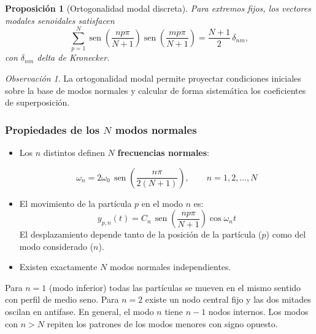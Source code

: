 \documentclass[12pt, a4paper]{article}
\theoremstyle{plain}
\newtheorem{proposicion}[teorema]{Proposición}
\theoremstyle{definition}
\theoremstyle{remark}
\newtheorem*{observacion}{Observación}
\DeclareMathOperator{\sen}{sen}
\begin{document}
\begin{proposicion}[Ortogonalidad modal discreta]
Para extremos fijos, los vectores modales senoidales satisfacen
\[
  \sum_{p=1}^{N}
  \sen\!\left(\frac{np\pi}{N+1}\right)
  \sen\!\left(\frac{mp\pi}{N+1}\right)
  =\frac{N+1}{2}\,\delta_{nm},
\]
con $\delta_{nm}$ delta de Kronecker.
\end{proposicion}

\begin{observacion}
La ortogonalidad modal permite proyectar condiciones iniciales sobre la base de modos
normales y calcular de forma sistemática los coeficientes de superposición.
\end{observacion}

\subsubsection{Propiedades de los \texorpdfstring{$N$}{N} modos normales}

\begin{itemize}
  \item Los $n$ distintos definen $N$ \textbf{frecuencias normales}:
  \begin{mdframed}[style=resultado]
\begin{equation}
    \omega_n = 2\omega_0\,\sen\!\left(\frac{n\pi}{2(N+1)}\right),
    \qquad n = 1, 2, \ldots, N
\end{equation}
  \end{mdframed}

  \item El movimiento de la partícula $p$ en el modo $n$ es:
\begin{equation}
    y_{p,n}(t) = C_n\,\sen\!\left(\frac{np\pi}{N+1}\right)\cos\omega_n t
\end{equation}
  El desplazamiento depende tanto de la posición de la partícula ($p$) como del modo
  considerado ($n$).

  \item Existen exactamente $N$ modos normales independientes.
\end{itemize}

Para $n=1$ (modo inferior) todas las partículas se mueven en el mismo sentido con perfil
de medio seno. Para $n=2$ existe un nodo central fijo y las dos mitades oscilan en
antifase. En general, el modo $n$ tiene $n-1$ nodos internos. Los modos con $n > N$
repiten los patrones de los modos menores con signo opuesto.
\end{document}
